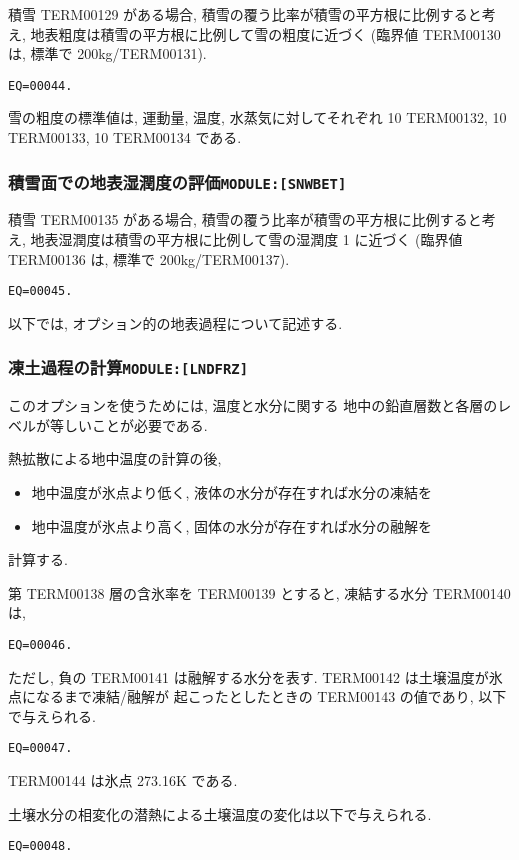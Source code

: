 積雪 TERM00129 がある場合, 
積雪の覆う比率が積雪の平方根に比例すると考え,
地表粗度は積雪の平方根に比例して雪の粗度に近づく
(臨界値 TERM00130 は, 標準で 200kg/TERM00131).
%
\begin{verbatim}
EQ=00044.
\end{verbatim}
%
雪の粗度の標準値は, 運動量, 温度, 水蒸気に対してそれぞれ
10 TERM00132, 10 TERM00133, 10 TERM00134 である. 

\subsubsection{積雪面での地表湿潤度の評価\texttt{MODULE:[SNWBET]}}

積雪 TERM00135 がある場合, 
積雪の覆う比率が積雪の平方根に比例すると考え,
地表湿潤度は積雪の平方根に比例して雪の湿潤度 1 に近づく
(臨界値 TERM00136 は, 標準で 200kg/TERM00137).
%
\begin{verbatim}
EQ=00045.
\end{verbatim}

\bigskip
以下では, オプション的の地表過程について記述する.
\bigskip

\subsubsection{凍土過程の計算\texttt{MODULE:[LNDFRZ]}}

このオプションを使うためには, 温度と水分に関する
地中の鉛直層数と各層のレベルが等しいことが必要である. 

熱拡散による地中温度の計算の後, 
\begin{itemize}
  \item 地中温度が氷点より低く, 液体の水分が存在すれば水分の凍結を
  \item 地中温度が氷点より高く, 固体の水分が存在すれば水分の融解を
\end{itemize}
計算する. 

第 TERM00138 層の含氷率を TERM00139 とすると, 凍結する水分 TERM00140 は, 
\begin{verbatim}
EQ=00046.
\end{verbatim}
ただし, 負の TERM00141 は融解する水分を表す. 
TERM00142 は土壌温度が氷点になるまで凍結/融解が
起こったとしたときの TERM00143 の値であり, 以下で与えられる. 
\begin{verbatim}
EQ=00047.
\end{verbatim}
TERM00144 は氷点 273.16K である. 

土壌水分の相変化の潜熱による土壌温度の変化は以下で与えられる. 
\begin{verbatim}
EQ=00048.
\end{verbatim}

